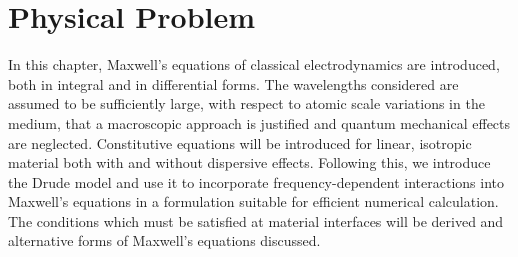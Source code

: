 \chapter{Physical Problem}
\label{PhysicalProblemChapter}
 In this chapter, Maxwell's equations
of classical electrodynamics are introduced, both in integral and in differential
forms. The wavelengths considered are assumed to be sufficiently large, with respect to
atomic scale variations in the medium, that a macroscopic approach is justified
and quantum mechanical effects are neglected. Constitutive equations will be
introduced for linear, isotropic material both with and without dispersive
effects. Following this, we introduce the Drude model and use it to incorporate
frequency-dependent interactions into Maxwell's equations in a formulation
suitable for efficient numerical calculation. The conditions which must be
satisfied at material interfaces will be derived and alternative forms of
Maxwell's equations discussed.

